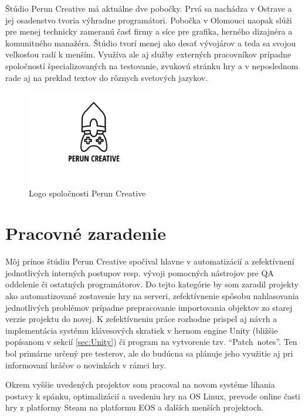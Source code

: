 \documentclass[slovak, bachelorpractice]{diploma}
\begin{document}
Štúdio Perun Creative má aktuálne dve pobočky. Prvá sa nachádza v Ostrave a jej osadenstvo tvoria výhradne programátori. Pobočka v Olomouci naopak slúži pre menej technicky zameranú časť firmy a síce pre grafika, herného dizajnéra a komunitného manažéra. Štúdio tvorí menej ako desať vývojárov a teda sa svojou veľkosťou radí k menším. Využíva ale aj služby externých pracovníkov prípadne spoločností špecializovaných na testovanie, zvukovú stránku hry a v neposlednom rade aj na preklad textov do rôznych svetových jazykov.
\vspace{-20pt}
\begin{figure}[!htbp]
	\centering
	\includegraphics[width=0.5\textwidth]{Pictures/perunLogo.pdf}
	\vspace{-35pt}
	\caption{Logo spoločnosti Perun Creative}
	\label{pic:perunLogo}
\end{figure}
\vspace{-20pt}
\section{Pracovné zaradenie}
\label{sec:Me}
Môj prínos štúdiu Perun Creative spočíval hlavne v automatizácií a zefektívnení jednotlivých interných postupov resp. vývoji pomocných nástrojov pre QA oddelenie či ostatných programátorov. Do tejto kategórie by som zaradil projekty ako automatizované zostavenie hry na serveri, zefektívnenie spôsobu nahlasovania jednotlivých problémov prípadne prepracovanie importovania objektov zo starej verzie projektu do novej. K zefektívneniu práce rozhodne prispel aj návrh a implementácia systému klávesových skratiek v hernom engine Unity (bližšie popísanom v sekcií \ref{sec:Unity}) či  program na vytvorenie tzv. \mbox{\enquote{Patch notes}}. Ten bol primárne určený pre testerov, ale do budúcna sa plánuje jeho využitie aj pri informovaní hráčov o novinkách v rámci hry.

Okrem vyššie uvedených projektov som pracoval na novom systéme líhania postavy k spánku, optimalizácií a uvedeniu hry na OS Linux, prevode online časti hry z platformy Steam na platformu EOS a ďalších menších projektoch.
\end{document}
